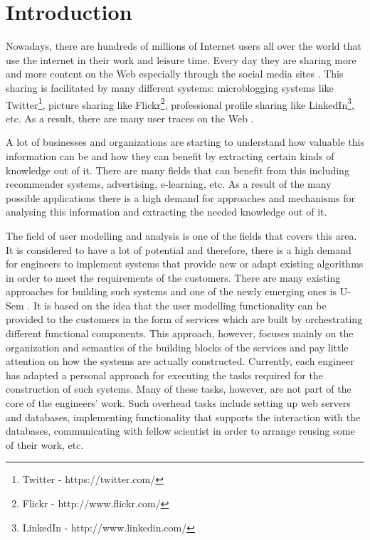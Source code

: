 
\chapter{\label{cha:intro}Introduction}

Nowadays, there are hundreds of millions of Internet users all over the world that use the internet in their work and leisure time. Every day they are sharing more and more content on the Web especially through the social media sites \cite{kaplan2010users}. This sharing is facilitated by many different systems: microblogging systems like Twitter\footnote{Twitter - https://twitter.com/}, picture sharing like Flickr\footnote{Flickr - http://www.flickr.com/}, professional profile sharing like LinkedIn\footnote{LinkedIn - http://www.linkedin.com/}, etc. As a result, there are many user traces on the Web \cite{abel2010interweaving}.

A lot of businesses and organizations are starting to understand how valuable this information can be and how they can benefit by extracting certain kinds of knowledge out of it. There are many fields that can benefit from this including recommender systems, advertising, e-learning, etc. As a result of the many possible applications there is a high demand for approaches and mechanisms for analysing this information and extracting the needed knowledge out of it. 

The field of user modelling and analysis is one of the fields that covers this area. It is considered to have a lot of potential \cite{brusilovsky2007adaptive} and therefore, there is a high demand for engineers to implement systems that provide new or adapt existing algorithms in order to meet the requirements of the customers. There are many existing approaches for building such systems \cite{kobsa2001generic} and one of the newly emerging ones is U-Sem \cite{abel2011u}. It is based on the idea that the user modelling functionality can be provided to the customers in the form of services which are built by orchestrating different functional components. This approach, however, focuses mainly on the organization and semantics of the building blocks of the services and pay little attention on how the systems are actually constructed. Currently, each engineer has adapted a personal approach for executing the tasks required for the construction of such systems. Many of these tasks, however, are not part of the core of the engineers' work. Such overhead tasks include setting up web servers and databases, implementing functionality that supports the interaction with the databases, communicating with fellow scientist in order to arrange reusing some of their work, etc. 


